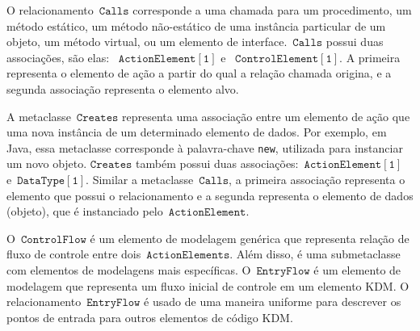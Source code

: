 O relacionamento~$\mathtt{Calls}$ corresponde a uma chamada para um procedimento, um método estático, um método não-estático de uma instância particular de um objeto, um método virtual, ou um elemento de interface.~$\mathtt{Calls}$ possui duas associações, são elas: ~$\mathtt{ActionElement[1]}$ e ~$\mathtt{ControlElement[1]}$. A primeira representa o elemento de ação a partir do qual a relação chamada origina, e a segunda associação representa o elemento alvo.


A metaclasse~$\mathtt{Creates}$ representa uma associação entre um elemento de ação que  uma nova instância de um determinado elemento de dados. Por exemplo, em Java, essa metaclasse corresponde à palavra-chave \texttt{new}, utilizada para instanciar um novo objeto. $\mathtt{Creates}$ também possui duas associações:~$\mathtt{ActionElement[1]}$ e~$\mathtt{DataType[1]}$. Similar a metaclasse~$\mathtt{Calls}$, a primeira associação representa o elemento que possui o relacionamento e a segunda representa o elemento de dados (objeto), que é instanciado pelo~$\mathtt{ActionElement}$.


O~$\mathtt{ControlFlow}$ é um elemento de modelagem genérica que representa relação de fluxo de controle entre dois~$\mathtt{ActionElements}$. Além disso, é uma submetaclasse com elementos de modelagens mais específicas. O~$\mathtt{EntryFlow}$ é um elemento de modelagem que representa um fluxo inicial de controle em um elemento KDM. O relacionamento~$\mathtt{EntryFlow}$ é usado de uma maneira uniforme para descrever os pontos de entrada para outros elementos de código KDM.

